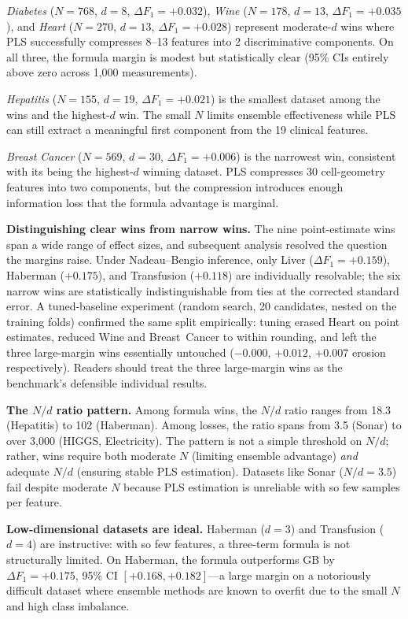 \documentclass[journal]{IEEEtran}
\begin{document}
\emph{Diabetes} ($N = 768$, $d = 8$, $\Delta F_1 = +0.032$),
\emph{Wine} ($N = 178$, $d = 13$, $\Delta F_1 = +0.035$), and
\emph{Heart} ($N = 270$, $d = 13$, $\Delta F_1 = +0.028$) represent
moderate-$d$ wins where PLS successfully compresses 8--13 features
into 2 discriminative components.  On all three, the formula margin
is modest but statistically clear (95\% CIs entirely above zero
across 1{,}000 measurements).

\emph{Hepatitis} ($N = 155$, $d = 19$, $\Delta F_1 = +0.021$) is
the smallest dataset among the wins and the highest-$d$ win.  The
small $N$ limits ensemble effectiveness while PLS can still extract
a meaningful first component from the 19 clinical features.

\emph{Breast Cancer} ($N = 569$, $d = 30$, $\Delta F_1 = +0.006$)
is the narrowest win, consistent with its being the highest-$d$
winning dataset.  PLS compresses 30 cell-geometry features into two
components, but the compression introduces enough information loss
that the formula advantage is marginal.

\textbf{Distinguishing clear wins from narrow wins.}
The nine point-estimate wins span a wide range of effect sizes,
and subsequent analysis resolved the question the margins raise.
Under Nadeau--Bengio inference, only Liver
($\Delta F_1 = +0.159$), Haberman ($+0.175$), and Transfusion
($+0.118$) are individually resolvable; the six narrow wins are
statistically indistinguishable from ties at the corrected
standard error.  A tuned-baseline experiment (random search, 20
candidates, nested on the training folds) confirmed the same
split empirically: tuning erased Heart on point estimates, reduced
Wine and Breast~Cancer to within rounding, and left the three
large-margin wins essentially untouched
($-0.000$, $+0.012$, $+0.007$ erosion respectively).  Readers
should treat the three large-margin wins as the benchmark's
defensible individual results.

\textbf{The $N/d$ ratio pattern.}
Among formula wins, the $N/d$ ratio ranges from 18.3 (Hepatitis)
to 102 (Haberman).  Among losses, the ratio spans from 3.5 (Sonar)
to over 3{,}000 (HIGGS, Electricity).  The pattern is not a simple
threshold on $N/d$; rather, wins require both moderate $N$ (limiting
ensemble advantage) \emph{and} adequate $N/d$ (ensuring stable PLS
estimation).  Datasets like Sonar ($N/d = 3.5$) fail despite moderate
$N$ because PLS estimation is unreliable with so few samples per
feature.

\textbf{Low-dimensional datasets are ideal.}
Haberman ($d = 3$) and Transfusion ($d = 4$) are instructive:
with so few features, a three-term formula is not structurally
limited.  On Haberman, the formula outperforms GB by
$\Delta F_1 = +0.175$, 95\% CI $[+0.168, +0.182]$---a large
margin on a notoriously difficult dataset where ensemble methods
are known to overfit due to the small $N$ and high class imbalance.
\end{document}
